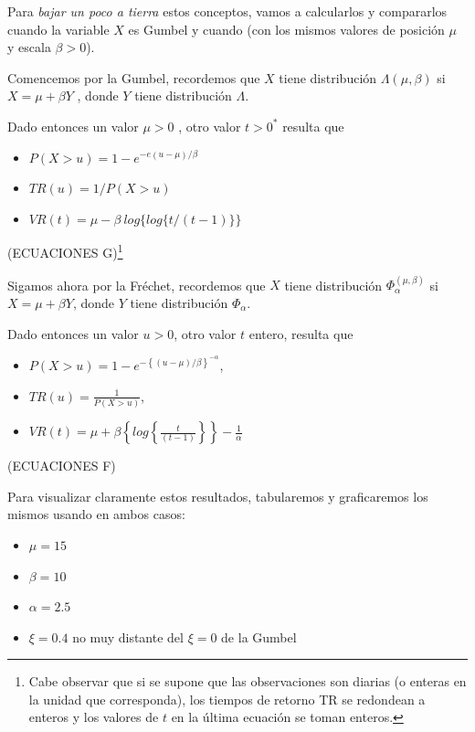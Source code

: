 \documentclass[
  oneside]{book}
\begin{document}
Para \textit{bajar un poco a tierra} estos conceptos, vamos a
calcularlos y compararlos cuando la variable \(X\) es Gumbel y cuando
(con los mismos valores de posición \(\mu\) y escala \(\beta>0\)).

Comencemos por la Gumbel, recordemos que \(X\) tiene distribución
\(\Lambda( \mu,\beta)\) si \(X= \mu+\beta Y\) , donde \(Y\) tiene
distribución \(\Lambda\).

Dado entonces un valor \(\mu>0\) , otro valor \(t>0^*\) resulta que

\begin{itemize}
\item $P(X>u)=1-e^{-e{(u-\mu)/ β }}$
\item $TR(u)=1/P(X>u)$
\item $VR(t)= \mu-\beta\: log\{log\{t/(t-1)\}\}$
\end{itemize}

(ECUACIONES
G)\footnote{Cabe observar que si se supone que las observaciones son diarias (o enteras en la unidad que corresponda), los tiempos de retorno TR se redondean a enteros y los valores de $t$ en la última ecuación se toman enteros.}

Sigamos ahora por la Fréchet, recordemos que \(X\) tiene distribución
\(\Phi_{\alpha}^{( \mu,\beta)}\) si \(X= \mu+\beta Y\), donde \(Y\)
tiene distribución \(\Phi_{\alpha}\).

Dado entonces un valor \(u>0\), otro valor \(t\) entero, resulta que

\begin{itemize}
\item $P(X>u)=1-e^{ -\left \{( u- \mu)/\beta\right \}^{-\alpha}}$,
\item $TR(u)=\frac{1}{P(X>u)}$,
\item $VR(t)= \mu+ \beta\left \{log\left \{ \frac{t}{(t-1)}\right \}\right \}-\frac{1}{\alpha}$
\end{itemize}

(ECUACIONES F)

Para visualizar claramente estos resultados, tabularemos y graficaremos
los mismos usando en ambos casos:

\begin{itemize}
\item $\mu=15$
\item $\beta=10$
\item $\alpha=2.5$
\item $\xi=0.4$ no muy distante del $\xi=0$ de la Gumbel
\end{itemize}
\end{document}
